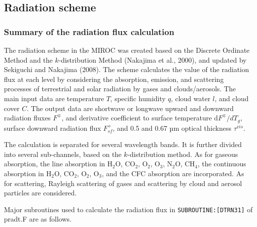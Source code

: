 \hypertarget{radiation-scheme}{%
\subsection{Radiation scheme}\label{radiation-scheme}}

\hypertarget{summary-of-the-radiation-flux-calculation}{%
\subsubsection{Summary of the radiation flux calculation}\label{summary-of-the-radiation-flux-calculation}}

The radiation scheme in the MIROC was created based on the Discrete Ordinate Method and the \(k\)-distribution Method (Nakajima et al., 2000), and updated by Sekiguchi and Nakajima (2008). The scheme
calculates the value of the radiation flux at each level by considering the absorption, emission, and scattering processes of terrestrial and solar radiation by gases and clouds/aerosols. The main
input data are temperature \(T\), specific humidity \(q\), cloud water \(l\), and cloud cover \(C\). The output data are shortwave or longwave upward and downward radiation fluxes \(F^{\mp}\), and
derivative coefficient to surface temperature \(\mathrm{d}F^{\mp}/dT_{g}\), surface downward radiation flux \(F_{sf}^{+}\), and 0.5 and 0.67 µm optical thickness \(\tau^{vis}\).

The calculation is separated for several wavelength bands. It is further divided into several sub-channels, based on the \(k\)-distribution method. As for gaseous absorption, the line absorption in
\(\mathrm{H_2O}\), \(\mathrm{CO_2}\), \(\mathrm{O_2}\), \(\mathrm{O_3}\), \(\mathrm{N_2} \mathrm{O}\), \(\mathrm{CH_4}\), the continuous absorption in \(\mathrm{H_2} \mathrm{O}\), \(\mathrm{CO_2}\),
\(\mathrm{O_2}\), \(\mathrm{O_3}\), and the CFC absorption are incorporated. As for scattering, Rayleigh scattering of gases and scattering by cloud and aerosol particles are considered.

Major subroutines used to calculate the radiation flux in \texttt{SUBROUTINE:{[}DTRN31{]}} of pradt.F are as follows.

